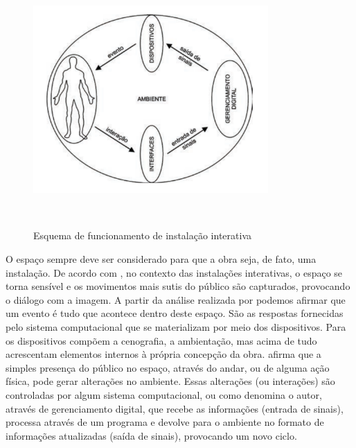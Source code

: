 \begin{figure}[H]
  \begin{center}
    \caption{Esquema de funcionamento de instalação interativa}
    \vspace*{0,2cm}
    \includegraphics[width=0.8\textwidth]{./04-figuras/instalacoes_interativas}
    \label{fig:instalacoes_interativas}
  \end{center}
  \vspace*{-0,9cm}
  \\
\end{figure}

O espaço sempre deve ser considerado para que a obra seja, de fato, uma instalação. De acordo com , no contexto das instalações interativas, o espaço se torna sensível e os movimentos mais sutis do público são capturados, provocando o diálogo com a imagem. A partir da análise realizada por  podemos afirmar que um evento é tudo que acontece dentro deste espaço. São as respostas fornecidas pelo sistema computacional que se materializam por meio dos dispositivos. Para  os dispositivos compõem a cenografia, a ambientação, mas acima de tudo acrescentam elementos internos à própria concepção da obra.  afirma que a simples presença do público no espaço, através do andar, ou de alguma ação física, pode gerar alterações no ambiente. Essas alterações (ou interações) são controladas por algum sistema computacional, ou como denomina o autor, através de gerenciamento digital, que recebe as informações (entrada de sinais), processa através de um programa e devolve para o ambiente no formato de informações atualizadas (saída de sinais), provocando um novo ciclo.

